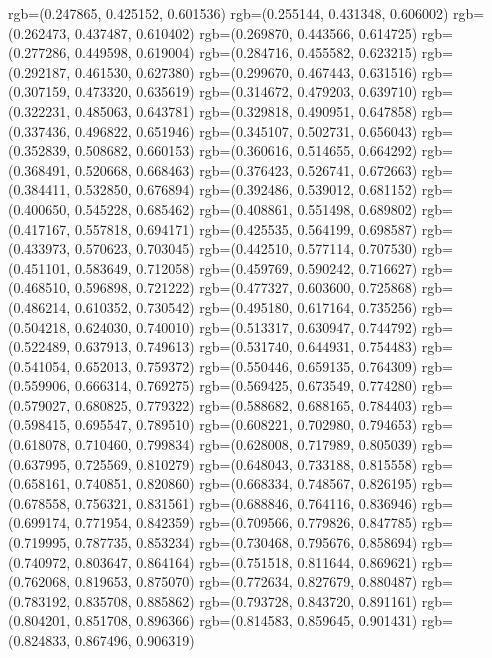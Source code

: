 {{{					rgb=(0.247865, 0.425152, 0.601536)
					rgb=(0.255144, 0.431348, 0.606002)
					rgb=(0.262473, 0.437487, 0.610402)
					rgb=(0.269870, 0.443566, 0.614725)
					rgb=(0.277286, 0.449598, 0.619004)
					rgb=(0.284716, 0.455582, 0.623215)
					rgb=(0.292187, 0.461530, 0.627380)
					rgb=(0.299670, 0.467443, 0.631516)
					rgb=(0.307159, 0.473320, 0.635619)
					rgb=(0.314672, 0.479203, 0.639710)
					rgb=(0.322231, 0.485063, 0.643781)
					rgb=(0.329818, 0.490951, 0.647858)
					rgb=(0.337436, 0.496822, 0.651946)
					rgb=(0.345107, 0.502731, 0.656043)
					rgb=(0.352839, 0.508682, 0.660153)
					rgb=(0.360616, 0.514655, 0.664292)
					rgb=(0.368491, 0.520668, 0.668463)
					rgb=(0.376423, 0.526741, 0.672663)
					rgb=(0.384411, 0.532850, 0.676894)
					rgb=(0.392486, 0.539012, 0.681152)
					rgb=(0.400650, 0.545228, 0.685462)
					rgb=(0.408861, 0.551498, 0.689802)
					rgb=(0.417167, 0.557818, 0.694171)
					rgb=(0.425535, 0.564199, 0.698587)
					rgb=(0.433973, 0.570623, 0.703045)
					rgb=(0.442510, 0.577114, 0.707530)
					rgb=(0.451101, 0.583649, 0.712058)
					rgb=(0.459769, 0.590242, 0.716627)
					rgb=(0.468510, 0.596898, 0.721222)
					rgb=(0.477327, 0.603600, 0.725868)
					rgb=(0.486214, 0.610352, 0.730542)
					rgb=(0.495180, 0.617164, 0.735256)
					rgb=(0.504218, 0.624030, 0.740010)
					rgb=(0.513317, 0.630947, 0.744792)
					rgb=(0.522489, 0.637913, 0.749613)
					rgb=(0.531740, 0.644931, 0.754483)
					rgb=(0.541054, 0.652013, 0.759372)
					rgb=(0.550446, 0.659135, 0.764309)
					rgb=(0.559906, 0.666314, 0.769275)
					rgb=(0.569425, 0.673549, 0.774280)
					rgb=(0.579027, 0.680825, 0.779322)
					rgb=(0.588682, 0.688165, 0.784403)
					rgb=(0.598415, 0.695547, 0.789510)
					rgb=(0.608221, 0.702980, 0.794653)
					rgb=(0.618078, 0.710460, 0.799834)
					rgb=(0.628008, 0.717989, 0.805039)
					rgb=(0.637995, 0.725569, 0.810279)
					rgb=(0.648043, 0.733188, 0.815558)
					rgb=(0.658161, 0.740851, 0.820860)
					rgb=(0.668334, 0.748567, 0.826195)
					rgb=(0.678558, 0.756321, 0.831561)
					rgb=(0.688846, 0.764116, 0.836946)
					rgb=(0.699174, 0.771954, 0.842359)
					rgb=(0.709566, 0.779826, 0.847785)
					rgb=(0.719995, 0.787735, 0.853234)
					rgb=(0.730468, 0.795676, 0.858694)
					rgb=(0.740972, 0.803647, 0.864164)
					rgb=(0.751518, 0.811644, 0.869621)
					rgb=(0.762068, 0.819653, 0.875070)
					rgb=(0.772634, 0.827679, 0.880487)
					rgb=(0.783192, 0.835708, 0.885862)
					rgb=(0.793728, 0.843720, 0.891161)
					rgb=(0.804201, 0.851708, 0.896366)
					rgb=(0.814583, 0.859645, 0.901431)
					rgb=(0.824833, 0.867496, 0.906319)
}}}
